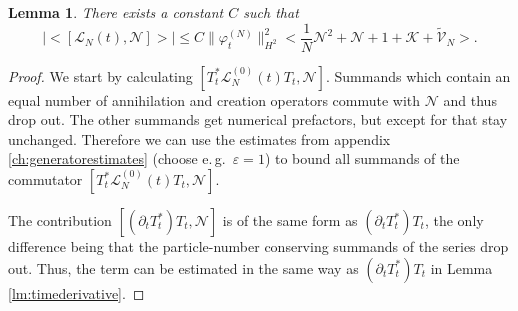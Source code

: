 \documentclass[11pt,a4paper,draft,DIV11]{scrartcl}	%
\newtheorem{lem}[thm]{Lemma}
\newcommand{\Lcal}{\mathcal{L}}		%
\newcommand{\Ncal}{\mathcal{N}}		%
\newcommand{\Kcal}{\mathcal{K}}		%
\newcommand{\tilV}{\tilde{\mathcal{V}}_N}		%
\newcommand{\hc}{\mbox{h.c.}}		%
\newcommand{\norm}[1]{\lVert#1\rVert}	%
\newcommand{\ev}[1]{\big<#1\big>}	%
\newcommand{\ph}{\varphi_t^{(N)}}	%
\newcommand{\bd}{\begin{displaymath}}			%
\newcommand{\ed}{\end{displaymath}}
\begin{document}
\begin{lem}
\label{lem:lncommutatorbound}
There exists a constant $C$ such that
 \bd
  \lvert \ev{[\Lcal_N(t),\Ncal]} \rvert \leq C \norm{\ph}_{H^2}^2 \ev{\frac{1}{N}\Ncal^2 + \Ncal + 1 + \Kcal + \tilV}.
 \ed
\end{lem}
\begin{proof}
We start by calculating $[T^\ast_t \Lcal_N^{(0)}(t)T_t,\Ncal]$. Summands which contain an equal number of annihilation and creation operators commute with $\Ncal$ and thus drop out. The other summands get numerical prefactors, but except for that stay unchanged. %
Therefore we can use the estimates from appendix \ref{ch:generatorestimates} (choose e.\,g.\ $\varepsilon = 1$) to bound all summands of the commutator $[T^\ast_t \Lcal_N^{(0)}(t)T_t,\Ncal]$.

The contribution $[(\partial_t T^\ast_t)T_t,\Ncal]$ is of the same form as $(\partial_t T^\ast_t)T_t$, the only difference being that the particle-number conserving summands of the series drop out. Thus, the term can be estimated in the same way as $(\partial_t T^\ast_t)T_t$ in Lemma \ref{lm:timederivative}.
\end{proof}
\end{document}
